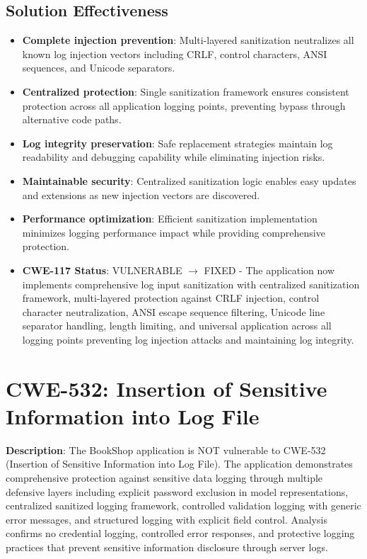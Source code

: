 \documentclass[]{UCD_CS_FYP_Report}
\begin{document}
\subsection{Solution Effectiveness}
\begin{itemize}
	\item \textbf{Complete injection prevention}: Multi-layered sanitization neutralizes all known log injection vectors including CRLF, control characters, ANSI sequences, and Unicode separators.
	\item \textbf{Centralized protection}: Single sanitization framework ensures consistent protection across all application logging points, preventing bypass through alternative code paths.
	\item \textbf{Log integrity preservation}: Safe replacement strategies maintain log readability and debugging capability while eliminating injection risks.
	\item \textbf{Maintainable security}: Centralized sanitization logic enables easy updates and extensions as new injection vectors are discovered.
	\item \textbf{Performance optimization}: Efficient sanitization implementation minimizes logging performance impact while providing comprehensive protection.
\end{itemize}

\begin{itemize}
	\item \textbf{CWE-117 Status}: VULNERABLE $\rightarrow$ FIXED - The application now implements comprehensive log input sanitization with centralized sanitization framework, multi-layered protection against CRLF injection, control character neutralization, ANSI escape sequence filtering, Unicode line separator handling, length limiting, and universal application across all logging points preventing log injection attacks and maintaining log integrity.
\end{itemize}


\section{CWE-532: Insertion of Sensitive Information into Log File}

\textbf{Description}: The BookShop application is NOT vulnerable to CWE-532 (Insertion of Sensitive Information into Log File). The application demonstrates comprehensive protection against sensitive data logging through multiple defensive layers including explicit password exclusion in model representations, centralized sanitized logging framework, controlled validation logging with generic error messages, and structured logging with explicit field control. Analysis confirms no credential logging, controlled error responses, and protective logging practices that prevent sensitive information disclosure through server logs.
\end{document}
